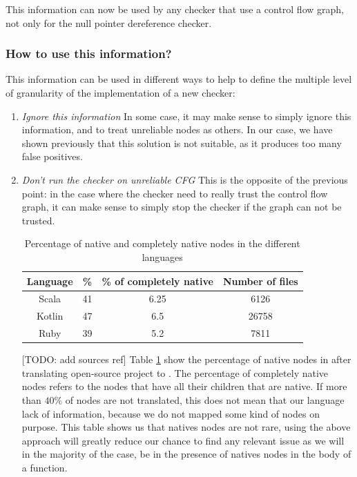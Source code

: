 This information can now be used by any checker that use a control flow graph, not only for the null pointer dereference checker.

\subsubsection{How to use this information?}
\label{subsubsec:use_unreliable_information}

This information can be used in different ways to help to define the multiple level of granularity of the implementation of a new checker:

\begin{enumerate}
\item \textit{Ignore this information} \newline
In some case, it may make sense to simply ignore this information, and to treat unreliable nodes as others. 
In our case, we have shown previously that this solution is not suitable, as it produces too many false positives. \newline

\item \textit{Don’t run the checker on unreliable CFG} \newline
This is the opposite of the previous point: in the case where the checker need to really trust the control flow graph, it can make sense to simply stop the checker if the graph can not be trusted.

\begin{table}[h]
	\centering
	\caption{Percentage of native and completely native nodes in the different languages}
	\label{table:slang-native-percentage}
	\begin{tabular}{|c|c|c|c|}
		\hline
		\bf Language & \bf \% & \bf \% of completely native & \bf Number of files \\ \hline
		Scala &  41 &  6.25 & 6126 \\ 
		Kotlin &  47 &  6.5 & 26758 \\ 
		Ruby &  39 &  5.2 &  7811 \\ \hline
	\end{tabular}
\end{table}

[TODO: add sources ref]
Table \ref{table:slang-native-percentage} show the percentage of native nodes in \slang after translating open-source project to \slang. The percentage of completely native nodes refers to the nodes that have all their children that are native. If more than $40\%$ of nodes are not translated, this does not mean that our language lack of information, because we do not mapped some kind of nodes on purpose.
This table shows us that natives nodes are not rare, using the above approach will greatly reduce our chance to find any relevant issue as we will in the majority of the case, be in the presence of natives nodes in the body of a function.


\end{enumerate}
